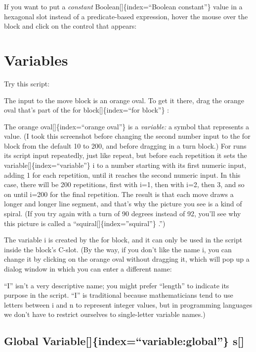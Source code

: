 \documentclass[
  letterpaper,
]{book}
\begin{document}
If you want to put a \emph{constant} Boolean{[}{]}\{index=``Boolean
constant''\} value in a hexagonal slot instead of a predicate-based
expression, hover the mouse over the block and click on the control that
appears:

\section{Variables}\label{variables}

Try this script:

The input to the move block is an orange oval. To get it there, drag the
orange oval that's part of the for block{[}{]}\{index=``for block''\} :

The orange oval{[}{]}\{index=``orange oval''\} is a \emph{variable:} a
symbol that represents a value. (I took this screenshot before changing
the second number input to the for block from the default 10 to 200, and
before dragging in a turn block.) For runs its script input repeatedly,
just like repeat, but before each repetition it sets the
variable{[}{]}\{index=``variable''\} i to a number starting with its
first numeric input, adding 1 for each repetition, until it reaches the
second numeric input. In this case, there will be 200 repetitions, first
with i=1, then with i=2, then 3, and so on until i=200 for the final
repetition. The result is that each move draws a longer and longer line
segment, and that's why the picture you see is a kind of spiral. (If you
try again with a turn of 90 degrees instead of 92, you'll see why this
picture is called a ``squiral{[}{]}\{index=''squiral''\} .'')

The variable i is created by the for block, and it can only be used in
the script inside the block's C-slot. (By the way, if you don't like the
name i, you can change it by clicking on the orange oval without
dragging it, which will pop up a dialog window in which you can enter a
different name:

``I'' isn't a very descriptive name; you might prefer ``length'' to
indicate its purpose in the script. ``I'' is traditional because
mathematicians tend to use letters between i and n to represent integer
values, but in programming languages we don't have to restrict ourselves
to single-letter variable names.)

\subsection{Global Variable{[}{]}\{index=``variable:global''\}
s{[}{]}}\label{global-variableindexvariableglobal-s}
\end{document}
